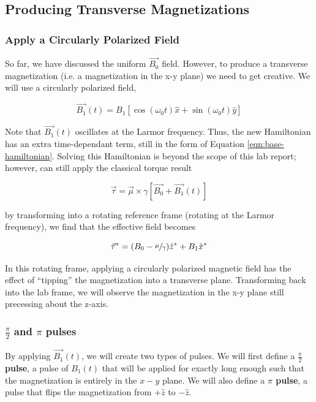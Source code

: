 \documentclass[%
 reprint,
 amsmath,amssymb,
 aps,
]{revtex4-2}
\newcommand{\halfpi}{\frac{\pi}{2}}
\begin{document}
\subsection{\label{sec:tipping}Producing Transverse Magnetizations}

\subsubsection{Apply a Circularly Polarized Field}

So far, we have discussed the uniform $\vec{B_0}$ field. However, to produce a transverse magnetization (i.e. a magnetization in the x-y plane) we need to get creative. We will use a circularly polarized field, 

\begin{equation}
    \vec{B_1}(t) = B_1\left[\cos(\omega_0t)\hat{x}+\sin(\omega_0t)\hat{y}\right]
\end{equation}

Note that $\vec{B_1}(t)$ oscillates at the Larmor frequency. Thus, the new Hamiltonian has an extra time-dependant term, still in the form of Equation \ref{eqn:base-hamiltonian}. Solving this Hamiltonian is beyond the scope of this lab report; however, can still apply the classical torque result \cite{principles-resonance}

\begin{equation}
    \vec{\tau} = \vec{\mu} \times \gamma \left[\vec{B_0}+\vec{B_1}(t)\right]
\end{equation}

by transforming into a rotating reference frame (rotating at the Larmor frequency), we find that the effective field becomes 

\begin{equation}
    \vec{\tau}^* = (B_0 - \sfrac{\mu}{\gamma}) \hat{z}^*+ B_1 \hat{x}^*
\end{equation}

In this rotating frame, applying a circularly polarized magnetic field has the effect of ``tipping'' the magnetization into a transverse plane. Transforming back into the lab frame, we will observe the magnetization in the x-y plane still precessing about the z-axis. 
\subsubsection{$\halfpi$ and $\pi$ pulses}

By applying $\vec{B_1}(t)$, we will create two types of pulses. We will first define a \textbf{$\halfpi$ pulse}, a pulse of $B_1(t)$ that will be applied for exactly long enough such that the magnetization is entirely in the $x-y$ plane. We will also define a \textbf{$\pi$ pulse}, a pulse that flips the magnetization from $+\hat{z}$ to $-\hat{z}$. 
\end{document}
